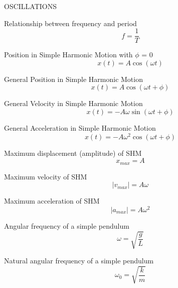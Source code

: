 \documentclass[12pt, letterpaper, twoside]{article}
\begin{document}
\newpage

OSCILLATIONS
$$ $$



Relationship between frequency and period
$$ f = \frac{1}{T} $$

Position in Simple Harmonic Motion with $\phi$ = 0
$$ x(t) = A \cos (\omega t) $$


General Position in Simple Harmonic Motion
$$ x(t)  = A \cos (\omega t + \phi) $$


General Velocity in Simple Harmonic Motion
$$ x(t)  = -A \omega \sin (\omega t + \phi) $$


General Acceleration in Simple Harmonic Motion
$$ x(t)  = -A \omega^2 \cos (\omega t + \phi) $$


Maximum displacement (amplitude) of SHM
$$ x_{max} = A $$


Maximum velocity of SHM
$$ |v_{max}| = A \omega $$


Maximum acceleration of SHM
$$ |a_{max}| = A \omega^2 $$



Angular frequency of a simple pendulum
$$ \omega = \sqrt{\frac{g}{L}} $$



Natural angular frequency of a simple pendulum
$$ \omega_0 = \sqrt{\frac{k}{m}} $$











\newpage
\end{document}
